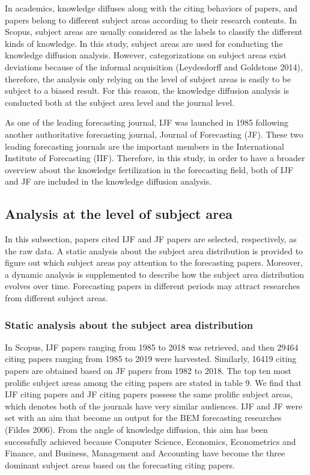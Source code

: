 \documentclass[11pt,a4paper]{elsarticle} %
\begin{document}
In academics, knowledge diffuses along with the citing behaviors of
papers, and papers belong to different subject areas according to their
research contents. In Scopus, subject areas are usually considered as
the labels to classify the different kinds of knowledge. In this study,
subject areas are used for conducting the knowledge diffusion analysis.
However, categorizations on subject areas exist deviations because of
the informal acquisition (Leydesdorff and Goldstone 2014), therefore,
the analysis only relying on the level of subject areas is easily to be
subject to a biased result. For this reason, the knowledge diffusion
analysis is conducted both at the subject area level and the journal
level.

As one of the leading forecasting journal, IJF was launched in 1985
following another authoritative forecasting journal, Journal of
Forecasting (JF). These two leading forecasting journals are the
important members in the International Institute of Forecasting (IIF).
Therefore, in this study, in order to have a broader overview about the
knowledge fertilization in the forecasting field, both of IJF and JF are
included in the knowledge diffusion analysis.

\subsection{Analysis at the level of subject
area}\label{analysis-at-the-level-of-subject-area}

In this subsection, papers cited IJF and JF papers are selected,
respectively, as the raw data. A static analysis about the subject area
distribution is provided to figure out which subject areas pay attention
to the forecasting papers. Moreover, a dynamic analysis is supplemented
to describe how the subject area distribution evolves over time.
Forecasting papers in different periods may attract researches from
different subject areas.

\subsubsection{Static analysis about the subject area
distribution}\label{static-analysis-about-the-subject-area-distribution}

In Scopus, IJF papers ranging from 1985 to 2018 was retrieved, and then
29464 citing papers ranging from 1985 to 2019 were harvested. Similarly,
16419 citing papers are obtained based on JF papers from 1982 to 2018.
The top ten most prolific subject areas among the citing papers are
stated in table 9. We find that IJF citing papers and JF citing papers
possess the same prolific subject areas, which denotes both of the
journals have very similar audiences. IJF and JF were set with an aim
that become an output for the BEM forecasting researches (Fildes 2006).
From the angle of knowledge diffusion, this aim has been successfully
achieved because Computer Science, Economics, Econometrics and Finance,
and Business, Management and Accounting have become the three dominant
subject areas based on the forecasting citing papers.
\end{document}
